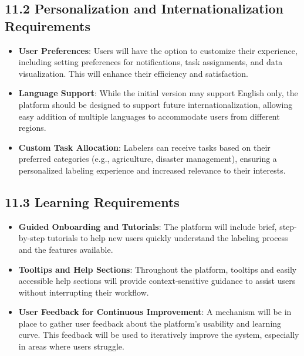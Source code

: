 \documentclass[12pt]{article}
\begin{document}
\subsection*{11.2 Personalization and Internationalization Requirements}
\begin{itemize}[leftmargin=2cm]
    \item \textbf{User Preferences}: Users will have the option to customize their experience, including setting preferences for notifications, task assignments, and data visualization. This will enhance their efficiency and satisfaction.
    \item \textbf{Language Support}: While the initial version may support English only, the platform should be designed to support future internationalization, allowing easy addition of multiple languages to accommodate users from different regions.
    \item \textbf{Custom Task Allocation}: Labelers can receive tasks based on their preferred categories (e.g., agriculture, disaster management), ensuring a personalized labeling experience and increased relevance to their interests.
\end{itemize}

\subsection*{11.3 Learning Requirements}
\begin{itemize}[leftmargin=2cm]
    \item \textbf{Guided Onboarding and Tutorials}: The platform will include brief, step-by-step tutorials to help new users quickly understand the labeling process and the features available.
    \item \textbf{Tooltips and Help Sections}: Throughout the platform, tooltips and easily accessible help sections will provide context-sensitive guidance to assist users without interrupting their workflow.
    \item \textbf{User Feedback for Continuous Improvement}: A mechanism will be in place to gather user feedback about the platform’s usability and learning curve. This feedback will be used to iteratively improve the system, especially in areas where users struggle.
\end{itemize}
\end{document}
